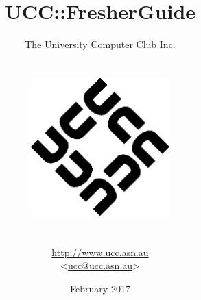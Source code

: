 \begin{titlepage}


\title{UCC::FresherGuide}
\author{The University Computer Club Inc. \\ \\ \\
	\includegraphics[width=0.4\textwidth]{figures/ucc-logo.png} \\  \\ \\ %
	\url{http://www.ucc.asn.au} \\ <\href{mailto:ucc@ucc.asn.au}{ucc@ucc.asn.au}> \\
}

\date{February 2017}



\maketitle
\centering



\end{titlepage}
